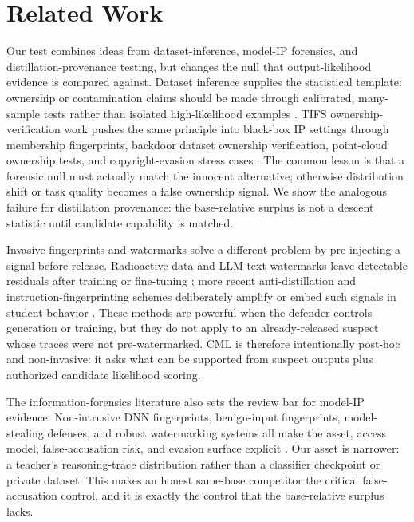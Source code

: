 \documentclass[journal]{IEEEtran}
\begin{document}
\section{Related Work}
\label{sec:related}

Our test combines ideas from dataset-inference, model-IP forensics, and
distillation-provenance testing, but changes the null that output-likelihood evidence
is compared against. Dataset inference supplies the statistical template: ownership
or contamination claims should be made through calibrated, many-sample tests rather
than isolated high-likelihood examples
\citep{maini2021datasetinference, maini2024llmdatasetinference,
oren2024testsetcontamination, zhao2025posthocdatasetinference,
dziedzic2022selfsupervised}. TIFS ownership-verification work pushes the same
principle into black-box IP settings through membership fingerprints, backdoor
dataset ownership verification, point-cloud ownership tests, and copyright-evasion
stress cases \citep{liu2022membershipfingerprint, li2023dvbw, wei2025pointncbw,
gao2026ceat2i}. The common lesson is that a forensic null must actually match the
innocent alternative; otherwise distribution shift or task quality becomes a false
ownership signal. We show the analogous failure for distillation provenance: the
base-relative surplus is not a descent statistic until candidate capability is
matched.

Invasive fingerprints and watermarks solve a different problem by pre-injecting a
signal before release. Radioactive data and LLM-text watermarks leave detectable
residuals after training or fine-tuning
\citep{sablayrolles2020radioactivedata, sander2024radioactive}; more recent
anti-distillation and instruction-fingerprinting schemes deliberately amplify or
embed such signals in student behavior
\citep{xu2026antidistillation, yang2026askingback,
xu2024instructionalfingerprinting}. These methods are powerful when the defender
controls generation or training, but they do not apply to an already-released
suspect whose traces were not pre-watermarked. CML is therefore intentionally
post-hoc and non-invasive: it asks what can be supported from suspect outputs plus
authorized candidate likelihood scoring.

The information-forensics literature also sets the review bar for model-IP evidence.
Non-intrusive DNN fingerprints, benign-input fingerprints, model-stealing defenses,
and robust watermarking systems all make the asset, access model, false-accusation
risk, and evasion surface explicit
\citep{zheng2022dnnfingerprint, maho2023fbi, zhang2023cip, zhang2023apmsa,
chen2025queen, gao2024augsteal, li2023linearfunctionality, fei2024wideflat,
zhou2024inversionguided, xu2025ipprotection, yan2025robustnessfingerprint}. Our
asset is narrower: a teacher's reasoning-trace distribution rather than a classifier
checkpoint or private dataset. This makes an honest same-base competitor the critical
false-accusation control, and it is exactly the control that the base-relative
surplus lacks.
\end{document}
